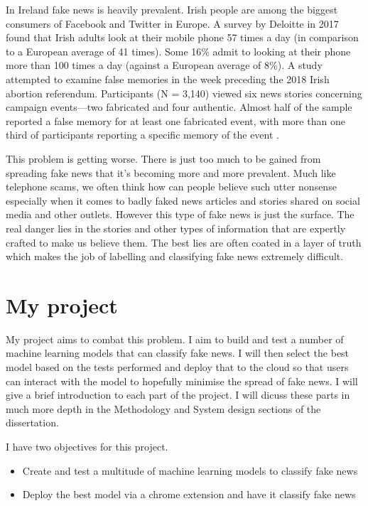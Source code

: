 In Ireland fake news is heavily prevalent. Irish people are among the biggest consumers of Facebook and Twitter in Europe. A survey by Deloitte in 2017 found that Irish adults look at their mobile phone 57 times a day (in comparison to a European average of 41 times). Some 16\% admit to looking at their phone more than 100 times a day (against a European average of 8\%). A study attempted to examine false memories in the week preceding the 2018 Irish abortion referendum. Participants (N = 3,140) viewed six news stories concerning campaign events—two fabricated and four authentic. Almost half of the sample reported a false memory for at least one fabricated event, with more than one third of participants reporting a specific memory of the event \cite{murphy2019false}.

This problem is getting worse. There is just too much to be gained from spreading fake news that it's becoming more and more prevalent. Much like telephone scams, we often think how can people believe such utter nonsense especially when it comes to badly faked news articles and stories shared on social media and other outlets. However this type of fake news is just the surface. The real danger lies in the stories and other types of information that are expertly crafted to make us believe them. The best lies are often coated in a layer of truth which makes the job of labelling and classifying fake news extremely difficult.

\section{My project}
My project aims to combat this problem. I aim to build and test a number of machine learning models that can classify fake news. I will then select the best model based on the tests performed and deploy that to the cloud so that users can interact with the model to hopefully minimise the spread of fake news. I will give a brief introduction to each part of the project. I will dicuss these parts in much more depth in the Methodology and System design sections of the dissertation.

I have two objectives for this project.
\begin{itemize}
  \item Create and test a multitude of machine learning models to classify fake news 
  \item Deploy the best model via a chrome extension and have it classify fake news 
\end{itemize}

